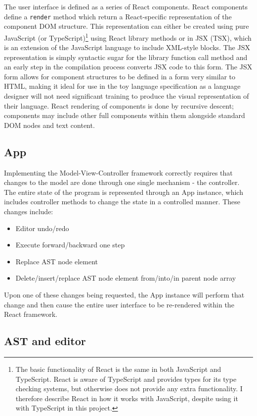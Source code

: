 The user interface is defined as a series of React components. React components define a \verb+render+ method which return a React-specific representation of the component DOM structure. This representation can either be created using pure JavaScript (or TypeScript)\footnote{The basic functionality of React is the same in both JavaScript and TypeScript. React is aware of TypeScript and provides types for its type checking systems, but otherwise does not provide any extra functionality. I therefore describe React in how it works with JavaScript, despite using it with TypeScript in this project.} using React library methods or in JSX (TSX), which is an extension of the JavaScript language to include XML-style blocks. The JSX representation is simply syntactic sugar for the library function call method and an early step in the compilation process converts JSX code to this form. The JSX form allows for component structures to be defined in a form very similar to HTML, making it ideal for use in the toy language specification as a language designer will not need significant training to produce the visual representation of their language. React rendering of components is done by recursive descent; components may include other full components within them alongside standard DOM nodes and text content.

\subsection{App}
Implementing the Model-View-Controller framework correctly requires that changes to the model are done through one single mechanism - the controller. The entire state of the program is represented through an App instance, which includes controller methods to change the state in a controlled manner. These changes include:
\begin{itemize}
\item Editor undo/redo
\item Execute forward/backward one step
\item Replace AST node element
\item Delete/insert/replace AST node element from/into/in parent node array
\end{itemize}

Upon one of these changes being requested, the App instance will perform that change and then cause the entire user interface to be re-rendered within the React framework.

\subsection{AST and editor}

